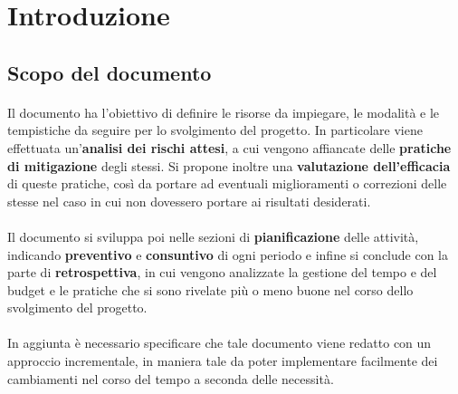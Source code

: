 \documentclass[10pt, a4paper]{article}
\title{\titolo}
\author{SWEetCode}
\begin{document}



\newpage

\tableofcontents
\newpage
\listoffigures
\newpage
\listoftables
\newpage


\section{Introduzione}


\subsection{Scopo del documento}
\paragraph{}Il documento ha l'obiettivo di definire le risorse da impiegare, le modalità e le tempistiche da seguire per lo svolgimento del progetto. In particolare viene effettuata un'\textbf{analisi dei rischi attesi}, a cui vengono affiancate delle \textbf{pratiche di mitigazione} degli stessi. Si propone inoltre una \textbf{valutazione dell'efficacia} di queste pratiche, così da portare ad eventuali miglioramenti o correzioni delle stesse nel caso in cui non dovessero portare ai risultati desiderati.
\paragraph{}Il documento si sviluppa poi nelle sezioni di \textbf{pianificazione} delle attività, indicando \textbf{preventivo} e \textbf{consuntivo} di ogni periodo e infine si conclude con la parte di \textbf{retrospettiva}, in cui vengono analizzate la gestione del tempo e del budget e le pratiche che si sono rivelate più o meno buone nel corso dello svolgimento del progetto.
\paragraph{}In aggiunta è necessario specificare che tale documento viene redatto con un approccio incrementale, in maniera tale da poter implementare facilmente dei cambiamenti nel corso del tempo a seconda delle necessità.



\end{document}
